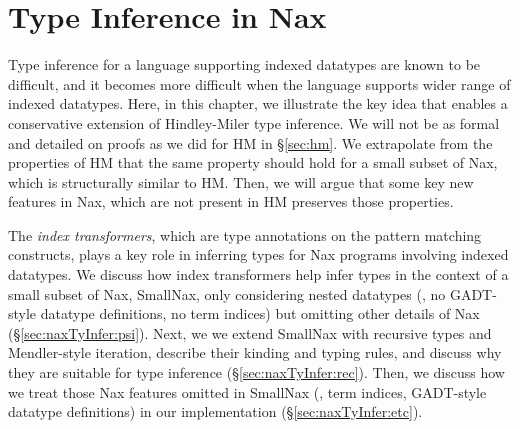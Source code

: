 \chapter{Type Inference in Nax} \label{ch:naxTyInfer}
Type inference for a language supporting indexed datatypes are
known to be difficult, and it becomes more difficult when the language
supports wider range of indexed datatypes. Here, in this chapter, we
illustrate the key idea that enables a conservative extension of
Hindley-Miler type inference. We will not be as formal and detailed
on proofs as we did for HM in \S\ref{sec:hm}. We extrapolate from
the properties of HM that the same property should hold for
a small subset of Nax, which is structurally similar to HM.
Then, we will argue that some key new features in Nax, which are
not present in HM preserves those properties.

The \emph{index transformers}, which are type annotations on
the pattern matching constructs, plays a key role in inferring types for
Nax programs involving indexed datatypes. We discuss how index transformers
help infer types in the context of a small subset of Nax, SmallNax, only
considering nested datatypes (\ie, no GADT-style datatype definitions,
no term indices) but omitting other details of Nax (\S\ref{sec:naxTyInfer:psi}).
Next, we we extend SmallNax with recursive types and Mendler-style iteration,
describe their kinding and typing rules, and discuss why they are suitable
for type inference (\S\ref{sec:naxTyInfer:rec}). Then, we discuss how we
treat those Nax features omitted in SmallNax (\eg, term indices, GADT-style
datatype definitions) in our implementation (\S\ref{sec:naxTyInfer:etc}).




